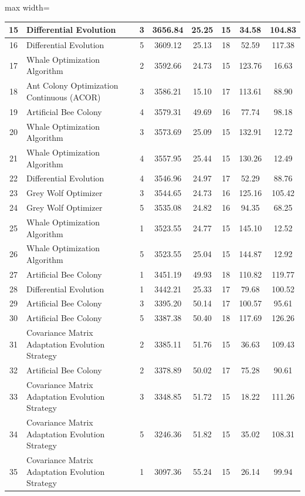 \documentclass[Afour,sagev,times]{sagej}
\begin{document}
\begin{table}[htbp]
\begin{adjustbox}{max width=\textwidth}
\begin{tabular}{|c|l|c|c|c|c|c|c|}
15 & Differential Evolution & 3 & 3656.84 & 25.25 & 15 & 34.58 & 104.83 \\ \hline
16 & Differential Evolution & 5 & 3609.12 & 25.13 & 18 & 52.59 & 117.38 \\ \hline
17 & Whale Optimization Algorithm & 2 & 3592.66 & 24.73 & 15 & 123.76 & 16.63 \\ \hline
18 & Ant Colony Optimization Continuous (ACOR) & 3 & 3586.21 & 15.10 & 17 & 113.61 & 88.90 \\ \hline
19 & Artificial Bee Colony & 4 & 3579.31 & 49.69 & 16 & 77.74 & 98.18 \\ \hline
20 & Whale Optimization Algorithm & 3 & 3573.69 & 25.09 & 15 & 132.91 & 12.72 \\ \hline
21 & Whale Optimization Algorithm & 4 & 3557.95 & 25.44 & 15 & 130.26 & 12.49 \\ \hline
22 & Differential Evolution & 4 & 3546.96 & 24.97 & 17 & 52.29 & 88.76 \\ \hline
23 & Grey Wolf Optimizer & 3 & 3544.65 & 24.73 & 16 & 125.16 & 105.42 \\ \hline
24 & Grey Wolf Optimizer & 5 & 3535.08 & 24.82 & 16 & 94.35 & 68.25 \\ \hline
25 & Whale Optimization Algorithm & 1 & 3523.55 & 24.77 & 15 & 145.10 & 12.52 \\ \hline
26 & Whale Optimization Algorithm & 5 & 3523.55 & 25.04 & 15 & 144.87 & 12.92 \\ \hline
27 & Artificial Bee Colony & 1 & 3451.19 & 49.93 & 18 & 110.82 & 119.77 \\ \hline
28 & Differential Evolution & 1 & 3442.21 & 25.33 & 17 & 79.68 & 100.52 \\ \hline
29 & Artificial Bee Colony & 3 & 3395.20 & 50.14 & 17 & 100.57 & 95.61 \\ \hline
30 & Artificial Bee Colony & 5 & 3387.38 & 50.40 & 18 & 117.69 & 126.26 \\ \hline
31 & Covariance Matrix Adaptation Evolution Strategy & 2 & 3385.11 & 51.76 & 15 & 36.63 & 109.43 \\ \hline
32 & Artificial Bee Colony & 2 & 3378.89 & 50.02 & 17 & 75.28 & 90.61 \\ \hline
33 & Covariance Matrix Adaptation Evolution Strategy & 3 & 3348.85 & 51.72 & 15 & 18.22 & 111.26 \\ \hline
34 & Covariance Matrix Adaptation Evolution Strategy & 5 & 3246.36 & 51.82 & 15 & 35.02 & 108.31 \\ \hline
35 & Covariance Matrix Adaptation Evolution Strategy & 1 & 3097.36 & 55.24 & 15 & 26.14 & 99.94 \\ \hline

\end{tabular}
\end{adjustbox}
\end{table}
\end{document}
